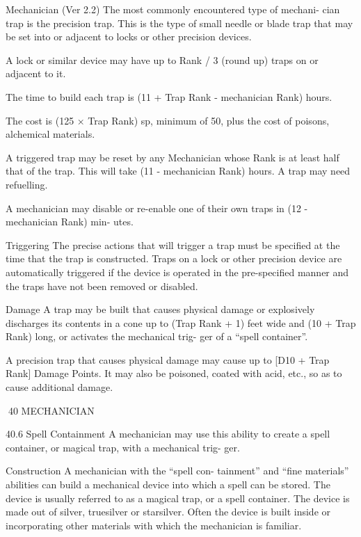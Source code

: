 \begin{Chapter}{Mechanician (Ver 2.2)}
The most commonly encountered type of mechani-
cian  trap  is  the  precision  trap.  This  is  the  type  of 
small  needle  or  blade  trap  that  may  be  set  into  or 
adjacent to locks or other precision devices. 

A  lock  or  similar device  may  have  up to  Rank / 3 
(round up) traps on or adjacent to it. 

The  time  to  build  each  trap  is  (11  +  Trap  Rank  - 
mechanician Rank) hours. 

The cost is (125 × Trap Rank) sp, minimum of 50, 
plus the cost of poisons, alchemical materials. 

A triggered trap may be reset by any Mechanician 
whose  Rank  is  at  least  half  that  of  the  trap.  This 
will  take  (11  -  mechanician  Rank)  hours.  A  trap 
may need refuelling. 

A  mechanician  may  disable  or  re-enable  one  of 
their  own  traps  in  (12  -  mechanician  Rank)  min-
utes. 

Triggering  The  precise  actions  that  will  trigger  a 
trap  must  be  specified  at  the  time  that  the  trap  is 
constructed.  Traps  on  a  lock  or  other  precision 
device  are  automatically  triggered  if  the  device  is 
operated  in  the  pre-specified  manner  and the  traps 
have not been removed or disabled. 

Damage  A  trap  may  be  built  that  causes  physical 
damage  or  explosively  discharges  its  contents in a 
cone  up  to  (Trap  Rank  +  1)  feet  wide  and  (10  + 
Trap  Rank)  long,  or  activates  the  mechanical  trig-
ger of a “spell container”. 

A  precision  trap  that  causes  physical  damage  may 
cause up to [D10 + Trap Rank] Damage Points.  It 
may also be poisoned, coated with acid, etc., so as 
to cause additional damage. 

40 MECHANICIAN 

40.6 Spell Containment 
A mechanician may use this ability to create a spell 
container,  or  magical  trap,  with  a  mechanical trig-
ger. 

Construction  A  mechanician  with  the  “spell  con-
tainment” and “fine materials” abilities can build a 
mechanical device into which a spell can be stored. 
The device is usually referred to as a magical trap, 
or  a  spell  container.  The  device  is  made  out  of 
silver,  truesilver  or  starsilver.  Often  the  device  is 
built  inside  or  incorporating  other  materials  with 
which the mechanician is familiar. 


\end{Chapter}
